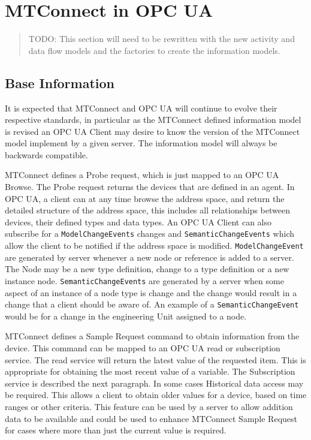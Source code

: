 \section{MTConnect in OPC UA}

\begin{quote}
    \color{red}
    TODO: This section will need to be rewritten with the new activity and data flow models and the factories to create the information models.
\end{quote}

\subsection{Base Information}

It is expected that MTConnect and OPC UA will continue to evolve their respective standards, in particular as the MTConnect defined information model is revised an OPC UA Client may desire to know the version of the MTConnect model implement by a given server. The information model will always be backwards compatible.

MTConnect defines a Probe request, which is just mapped to an OPC UA Browse. The Probe request returns the devices that are defined in an agent. In OPC UA, a client can at any time browse the address space, and return the detailed structure of the address space, this includes all relationships between devices, their defined types and data types. An OPC UA Client can also subscribe for a \texttt{ModelChangeEvents} changes and \texttt{SemanticChangeEvents} which allow the client to be notified if the address space is modified. \texttt{ModelChangeEvent} are generated by server whenever a new node or reference is added to a server. The Node may be a new type definition, change to a type definition or a new instance node. \texttt{SemanticChangeEvents} are generated by a server when some aspect of an instance of a node type is change and the change would result in a change that a client should be aware of. An example of a \texttt{SemanticChangeEvent} would be for a change in the engineering Unit assigned to a node.

MTConnect defines a Sample Request command to obtain information from the device. This command can be mapped to an OPC UA read or subscription service. The read service will return the latest value of the requested item. This is appropriate for obtaining the most recent value of a variable. The Subscription service is described the next paragraph. In some cases Historical data access may be required. This allows a client to obtain older values for a device, based on time ranges or other criteria. This feature can be used by a server to allow addition data to be available and could be used to enhance MTConnect Sample Request for cases where more than just the current value is required.

